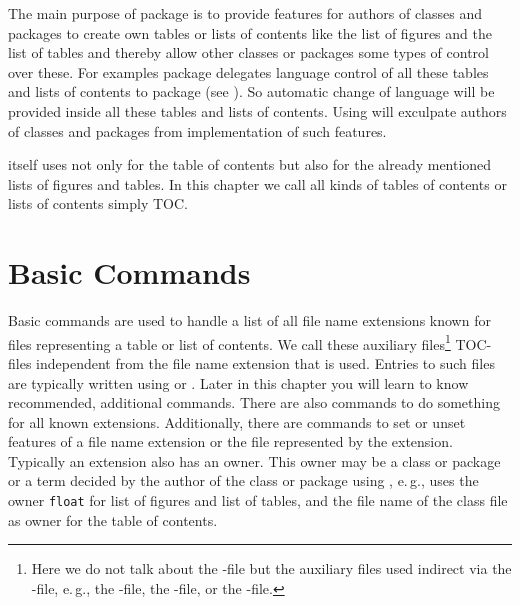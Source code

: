 %
%
%
%
The main purpose of package  is to provide features for
authors of classes and packages to create own tables or lists of contents like
the list of figures and the list of tables and thereby allow other classes or
packages some types of control over these. For examples package
 delegates language control of all these tables and lists of
contents to package  (see
\cite{package:babel}). So automatic change of language will be provided
inside all these tables and lists of contents. Using  will
exculpate authors of classes and packages from implementation of such
features.

\KOMAScript{} itself uses  not only for the table of
contents but also for the already mentioned lists of figures and
tables. In this chapter we call all kinds of tables of contents
or lists of contents simply TOC.

\section{Basic Commands}
\label{sec:tocbasic.basics}

Basic commands are used to handle a list of all file name
extensions known for
files representing a table or list of contents. We call these auxiliary
files\footnote{Here we do not talk about the
  -file but the auxiliary files used indirect via the
  -file, e.\,g., the -file, the -file, or the
  -file.}  TOC-files
independent from the file name extension that is used. Entries to such files
are typically written using
 or . Later in this chapter
you will learn to know recommended, additional commands.  There are also
commands to do something for all known extensions. Additionally, there are
commands to set or unset features of a file name extension or the file
represented by the extension.  Typically an extension also has an
owner.  This owner may be a class or package or a term
decided by the author of the class or package using ,
e.\,g., \KOMAScript{} uses the owner \texttt{float} for list of figures and
list of tables, and the file name of the class file as owner for the table of
contents.

